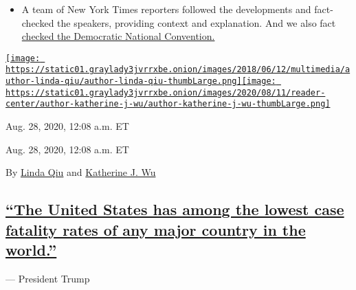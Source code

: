 \begin{itemize}
{  policy} and
  \href{https://www.nytimes3xbfgragh.onion/live/2020/08/27/us/rnc-fact-check\#joe-biden-claims-he-has-empathy-for-the-vulnerable-yet-the-party-he-leads-supports-the-extreme-late-term-abortion-of-defenseless}{abortion
  rights}, among other issues. And the president claimed to have lived
  up to his promises on other subjects, like building a border wall,
  even where the evidence
  \href{https://www.nytimes3xbfgragh.onion/live/2020/08/27/us/rnc-fact-check\#we-have-already-built-300-miles-of-border-wall-and-we-are-adding-10-new-miles-every-single-week-the-wall-will-soon-be-complete-a}{does
  not back him up}.
\item
  A team of New York Times reporters followed the developments and
  fact-checked the speakers, providing context and explanation. And we
  also fact
  \href{https://www.nytimes3xbfgragh.onion/2020/08/21/us/politics/fact-check-democrats.html}{checked
  the Democratic National Convention.}
\end{itemize}

\href{https://www.nytimes3xbfgragh.onion/by/linda-qiu}{\texttt{[image: https://static01.graylady3jvrrxbe.onion/images/2018/06/12/multimedia/author-linda-qiu/author-linda-qiu-thumbLarge.png]}}\href{https://www.nytimes3xbfgragh.onion/by/katherine-j--wu}{\texttt{[image: https://static01.graylady3jvrrxbe.onion/images/2020/08/11/reader-center/author-katherine-j-wu/author-katherine-j-wu-thumbLarge.png]}}

Aug. 28, 2020, 12:08 a.m. ET

Aug. 28, 2020, 12:08 a.m. ET

By \href{https://www.nytimes3xbfgragh.onion/by/linda-qiu}{Linda Qiu} and
\href{https://www.nytimes3xbfgragh.onion/by/katherine-j--wu}{Katherine
J. Wu}

\hypertarget{the-united-states-has-among-the-lowest-case-fatality-rates-of-any-major-country-in-the-world}{%
\subsection{\texorpdfstring{\protect\hyperlink{the-united-states-has-among-the-lowest-case-fatality-rates-of-any-major-country-in-the-world}{``The
United States has among the lowest case fatality rates of any major
country in the
world.''}}{``The United States has among the lowest case fatality rates of any major country in the world.''}}\label{the-united-states-has-among-the-lowest-case-fatality-rates-of-any-major-country-in-the-world}}

--- President Trump

